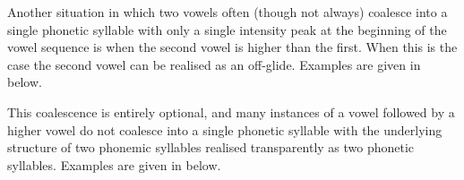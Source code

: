 \begin{exe}
\end{exe}

Another situation in which two vowels often (though not always)
coalesce into a single phonetic syllable with only a single intensity peak
at the beginning of the vowel sequence is when the second vowel
is higher than the first.
When this is the case the second vowel can be realised as an off-glide.
Examples are given in  below.

\begin{exe}
	\label{ex:VVSyl}
\end{exe}

This coalescence is entirely optional,
and many instances of a vowel followed by a higher vowel
do not coalesce into a single phonetic syllable
with the underlying structure of two phonemic syllables
realised transparently as two phonetic syllables.
Examples are given in  below.

